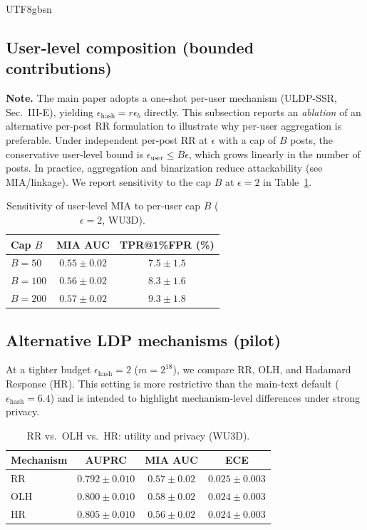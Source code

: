 \documentclass[acmsmall,natbib]{acmart}
\begin{document}
\begin{CJK*}{UTF8}{gbsn}
\subsection{User‑level composition (bounded contributions)}
\textbf{Note.} The main paper adopts a one-shot per-user mechanism (ULDP-SSR, Sec.~III-E), yielding $\epsilon_{\text{hash}}{=}r\epsilon_b$ directly. This subsection reports an \emph{ablation} of an alternative per-post RR formulation to illustrate why per-user aggregation is preferable. Under independent per‑post RR at $\epsilon$ with a cap of $B$ posts, the conservative user‑level bound is $\epsilon_{\text{user}} \le B\epsilon$, which grows linearly in the number of posts. In practice, aggregation and binarization reduce attackability (see MIA/linkage). We report sensitivity to the cap $B$ at $\epsilon{=}2$ in Table~\ref{tab:comp-B}.

\begin{table}[h]
\centering
\caption{Sensitivity of user‑level MIA to per‑user cap $B$ ($\epsilon{=}2$, WU3D).}
\label{tab:comp-B}
\setlength{\tabcolsep}{5.2pt}
\begin{tabular}{lcc}
\toprule
\textbf{Cap $B$} & \textbf{MIA AUC} & \textbf{TPR@1\%FPR (\%)} \\
\midrule
$B=50$  & $0.55{\pm}0.02$ & $7.5{\pm}1.5$ \\
$B=100$ & $0.56{\pm}0.02$ & $8.3{\pm}1.6$ \\
$B=200$ & $0.57{\pm}0.02$ & $9.3{\pm}1.8$ \\
\bottomrule
\end{tabular}
\end{table}

\subsection{Alternative LDP mechanisms (pilot)}
At a tighter budget $\epsilon_{\text{hash}}{=}2$ ($m{=}2^{18}$), we compare RR, OLH, and Hadamard Response (HR). This setting is more restrictive than the main-text default ($\epsilon_{\text{hash}}{=}6.4$) and is intended to highlight mechanism-level differences under strong privacy.

\begin{table}[h]
\centering
\caption{RR vs.\ OLH vs.\ HR: utility and privacy (WU3D).}
\label{tab:ldp-mechs}
\setlength{\tabcolsep}{6.0pt}
\begin{tabular}{lccc}
\toprule
\textbf{Mechanism} & \textbf{AUPRC} & \textbf{MIA AUC} & \textbf{ECE} \\
\midrule
RR & $0.792{\pm}0.010$ & $0.57{\pm}0.02$ & $0.025{\pm}0.003$ \\
OLH & $0.800{\pm}0.010$ & $0.58{\pm}0.02$ & $0.024{\pm}0.003$ \\
HR & $\mathbf{0.805}{\pm}0.010$ & $\mathbf{0.56}{\pm}0.02$ & $\mathbf{0.024}{\pm}0.003$ \\
\bottomrule
\end{tabular}
\end{table}


\end{CJK*}
\end{document}
